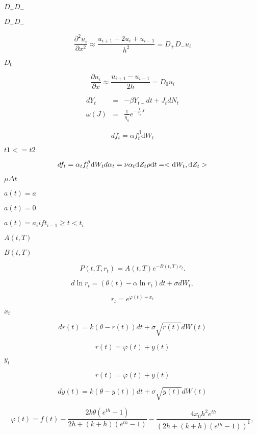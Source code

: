\documentclass{article}
\begin{document}
$ D_{+}D_{-} $
\pagebreak

$  D_{+}D_{-} $
\pagebreak

\[ \frac{\partial^2 u_{i}}{\partial x^2} \approx
    \frac{u_{i+1}-2u_{i}+u_{i-1}}{h^2} = D_{+}D_{-} u_{i}
\]
\pagebreak

$ D_{0} $
\pagebreak

\[ \frac{\partial u_{i}}{\partial x} \approx
    \frac{u_{i+1}-u_{i-1}}{2h} = D_{0} u_{i}
\]
\pagebreak

\[\begin{array}{rcl}
dY_t  &=& -\beta Y_{t-}dt + J_tdN_t \\
\omega(J)&=&\frac{1}{\eta_u}e^{-\frac{1}{\eta_u}J}
\end{array}
\]
\pagebreak

\[ df_t = \alpha f_t^\beta \mathrm{d}W_t
\]
\pagebreak

$t1 <= t2$
\pagebreak

\[ df_t = \alpha_t f_t^\beta \mathrm{d}W_t  \\
 d\alpha_t = \nu \alpha_t \mathrm{d}Z_t \\
 \rho \mathrm{d}t = < \mathrm{d}W_t, \mathrm{d}Z_t >
\]
\pagebreak

$ \mu \Delta t $
\pagebreak

$ a(t) = a $
\pagebreak

$ a(t) = 0 $
\pagebreak

$ a(t) = a_i if t_{i-1} \geq t < t_i $
\pagebreak

$ A(t,T) $
\pagebreak

$ B(t,T) $
\pagebreak

\[    P(t, T, r_t) = A(t,T)e^{ -B(t,T) r_t}.
\]
\pagebreak

\[    d\ln r_t = (\theta(t) - \alpha \ln r_t)dt + \sigma dW_t,
\]
\pagebreak

\[    r_t = e^{\varphi(t) + x_t}
\]
\pagebreak

$ x_t $
\pagebreak

\[    dr(t) = k(\theta - r(t))dt + \sigma \sqrt{r(t)} dW(t)
\]
\pagebreak

\[    r(t) = \varphi(t)+y(t)
\]
\pagebreak

$ y_t $
\pagebreak

\[    r(t) = \varphi(t) + y(t)
\]
\pagebreak

\[    dy(t)=k(\theta-y(t))dt+\sigma \sqrt{y(t)}dW(t)
\]
\pagebreak

\[    \varphi(t) = f(t) -
                 \frac{2k\theta(e^{th}-1)}{2h+(k+h)(e^{th}-1)} -
                 \frac{4 x_0 h^2 e^{th}}{(2h+(k+h)(e^{th}-1))^1},
\]
\pagebreak
\end{document}
